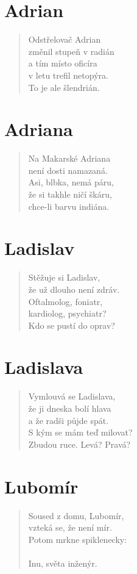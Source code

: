 \section*{Adrian}
\begin{verse}
Odstřelovač Adrian\\
změnil stupeň v radián\\
a tím místo oficíra\\
v letu trefil netopýra.\\
To je ale šlendrián.
\end{verse}

\section*{Adriana}
\begin{verse}
Na Makarské Adriana\\
není dosti namazaná.\\
Asi, blbka, nemá páru,\\
že si takhle ničí škáru,\\
chce-li barvu indiána.
\end{verse}

\section*{Ladislav}
\begin{verse}
Stěžuje si Ladislav,\\
že už dlouho není zdráv.\\
Oftalmolog, foniatr,\\
kardiolog, psychiatr?\\
Kdo se pustí do oprav?
\end{verse}

\section*{Ladislava}
\begin{verse}
Vymlouvá se Ladislava,\\
že ji dneska bolí hlava\\
a že radši půjde spát.\\
S kým se mám teď milovat?\\
Zbudou ruce. Levá? Pravá?
\end{verse}

\section*{Lubomír}
\begin{verse}
Soused z domu, Lubomír,\\
vzteká se, že není mír.\\
Potom mrkne spiklenecky:\\
\\
Inu, světa inženýr.
\end{verse}


